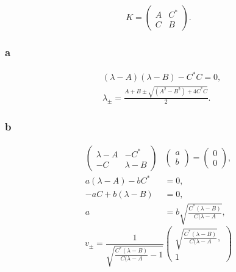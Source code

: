 \documentclass[a4paper,12pt,twoside]{article}
\begin{document}
\begin{multicols*}{2}
\subsection{}%
\begin{equation}
    K = \begin{pmatrix}
        A & C^* \\
        C & B
    \end{pmatrix}.
\end{equation}
\subsubsection*{a}
\begin{align}
    & (\lambda - A)(\lambda-B)-C^*C = 0,\\
    & \lambda_\pm = \frac{A+B \pm \sqrt{(A^2-B^2)+4C^*C}}{2}.
\end{align}
\subsubsection*{b}
\begin{align}
    \begin{pmatrix}
        \lambda-A & -C^* \\
        -C & \lambda-B
    \end{pmatrix}
    & \begin{pmatrix}
        a \\ b
    \end{pmatrix}
    = \begin{pmatrix}
        0 \\ 0
    \end{pmatrix},\\
    a(\lambda-A) - bC^* &= 0,\\
    -aC+b(\lambda-B) &=0,\\
    a &= b \sqrt{\frac{C^*(\lambda-B)}{C(\lambda-A}},
\end{align}
\begin{equation}
    v_\pm = \frac{1}{\sqrt{\frac{C^*(\lambda-B)}{C(\lambda-A}-1}}\begin{pmatrix}
            \sqrt{\frac{C^*(\lambda-B)}{C(\lambda-A}},\\
            1
        \end{pmatrix}
\end{equation}

\end{multicols*}
\end{document}
